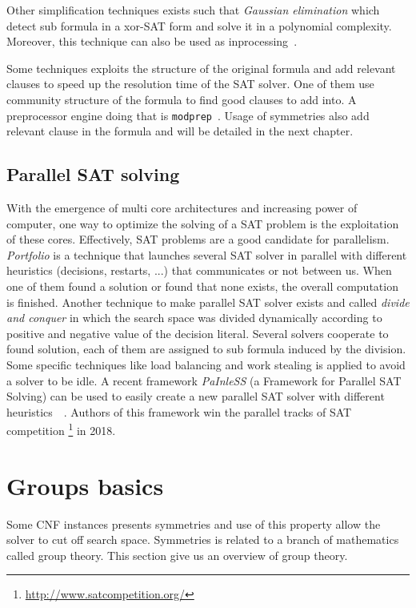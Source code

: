 Other simplification techniques exists such that \emph{Gaussian elimination} which detect sub formula in a xor-SAT
form and solve it in a polynomial complexity. Moreover, this technique can also be used as inprocessing~\cite{soos2010enhanced}. 

Some techniques exploits the structure of the original formula and add relevant clauses to speed up the resolution
time of the SAT solver. One of them use community structure of the formula to find good clauses to add into.
A preprocessor engine doing that is  \texttt{modprep}~\cite{ansotegui2015using}.
Usage of symmetries also add relevant clause in the formula and will be detailed in the next chapter.


\subsection{Parallel SAT solving}
With the emergence of multi core architectures and increasing power of computer, one way to optimize the solving
of a SAT problem is the exploitation of these cores. Effectively, SAT problems are a good candidate for parallelism.
\emph{Portfolio} is a technique that launches several SAT solver in parallel with different heuristics (decisions, restarts, ...) that communicates or not between us. When one of them found a solution or found that none exists, the overall computation is finished. Another technique to make parallel SAT solver exists and called \emph{divide and conquer} in which the search space was divided dynamically according to positive and negative value of the decision
literal. Several solvers cooperate to found solution, each of them are assigned to sub formula induced by the division. Some specific techniques like load balancing and work stealing is applied to avoid a solver to be idle.
A recent framework \emph{PaInleSS} (a Framework for Parallel SAT Solving) can be used to easily create a new parallel 
SAT solver with different heuristics~\cite{le2017painless}~\cite{le2019modular}. Authors of this framework win the parallel tracks of SAT competition \footnote{\url{http://www.satcompetition.org/}} in 2018.






\section{Groups basics}

Some CNF instances presents symmetries and use of this property allow the solver to cut off search space.
Symmetries is related to a branch of mathematics called group theory. This section give us an overview of group
theory.

